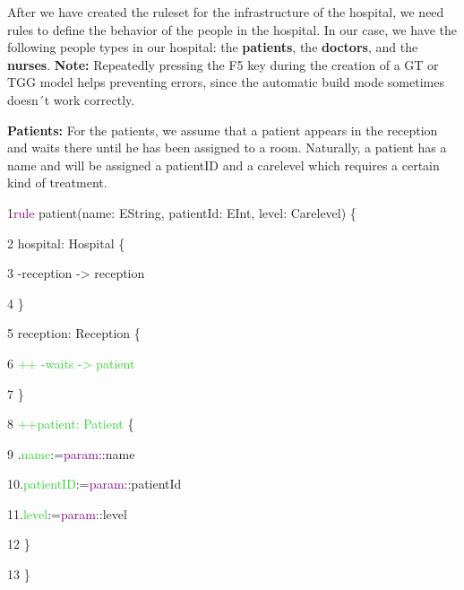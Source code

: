 After we have created the ruleset for the infrastructure of the hospital, we need rules to define the behavior of the people in the hospital. In our case, we have the following people types in our hospital: the \textbf{patients}, the \textbf{doctors}, and the \textbf{nurses}.\newline
\textbf{Note:} Repeatedly pressing the F5 key during the creation of a GT or TGG model helps preventing errors, since the automatic build mode sometimes doesn´t work correctly.\newline

\textbf{Patients:}\newline
For the patients, we assume that a patient appears in the reception and waits there until he has been assigned to a room. Naturally, a patient has a name and will be assigned a patientID and a carelevel which requires a certain kind of treatment.\newline\newline

{

1\hspace{0.5cm}\textcolor{Purple}{rule} patient(name: EString, patientId: EInt, level: Carelevel) \{

2\hspace{1cm}	hospital: Hospital \{

3\hspace{1.5cm}	-reception -> reception 

4\hspace{1cm}	\}

5\hspace{1cm}	reception: Reception \{

6\hspace{1.5cm}	\textcolor{LimeGreen}{++ -waits -> patient }

7\hspace{1cm} \}

8\hspace{1cm}	\textcolor{LimeGreen}{++patient: Patient} \{

9\hspace{1.5cm} .\textcolor{LimeGreen}{name}:=\textcolor{Purple}{param}::name

10\hspace{1.5cm}.\textcolor{LimeGreen}{patientID}:=\textcolor{Purple}{param}::patientId

11\hspace{1.5cm}.\textcolor{LimeGreen}{level}:=\textcolor{Purple}{param}::level

12\hspace{1cm} \}

13\hspace{0.5cm} \} \newline\newline

}

